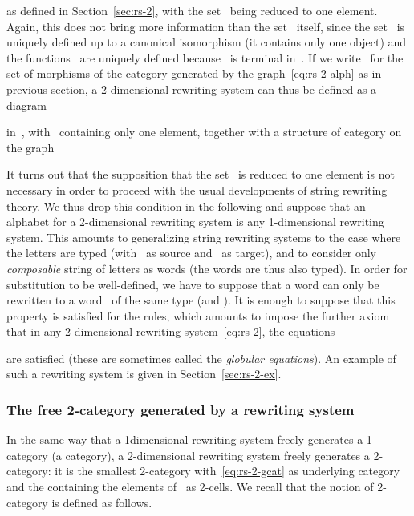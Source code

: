 \documentclass{LMCS}
\begin{document}
as defined in Section~\ref{sec:rs-2}, with the set~ being reduced to one
element. Again, this does not bring more information than the set~ itself,
since the set~ is uniquely defined up to a canonical isomorphism (it
contains only one object) and the functions~ are uniquely
defined because~ is terminal in~. If we write~ for the set of
morphisms of the category generated by the graph~\eqref{eq:rs-2-alph} as in
previous section, a 2-dimensional rewriting system can thus be defined as a
diagram

in~, with~ containing only one element, together with a structure of
category on the graph


It turns out that the supposition that the set~ is reduced to one element
is not necessary in order to proceed with the usual developments of string
rewriting theory. We thus drop this condition in the following and suppose that
an alphabet for a 2-dimensional rewriting system is any 1-dimensional rewriting
system. This amounts to generalizing string rewriting systems to the case where
the letters  are typed (with~ as source and~ as target), and to
consider only \emph{composable} string of letters as words (the words are thus
also typed). In order for substitution to be well-defined, we have to suppose
that a word  can only be rewritten to a word~ of the same
type (\ie  and ). It is enough to suppose that this property is
satisfied for the rules, which amounts to impose the further axiom that in any
2-dimensional rewriting system~\eqref{eq:rs-2}, the equations

are satisfied (these are sometimes called the \emph{globular equations}).
An example of such a rewriting system is given in Section~\ref{sec:rs-2-ex}.

\subsubsection{The free 2-category generated by a rewriting system}
\label{sec:rs-free-2-cat}
In the same way that a 1\nbd{}dimensional rewriting system freely generates a
1-category (\ie a category), a 2-dimensional rewriting system freely generates a
2-category: it is the smallest 2-category with~\eqref{eq:rs-2-gcat} as
underlying category and the containing the elements of~ as 2-cells. We
recall that the notion of 2-category is defined as follows.
\end{document}
